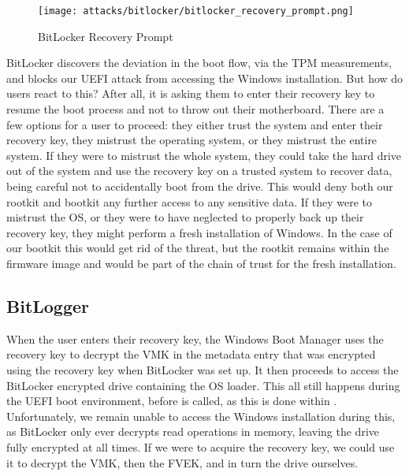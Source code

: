 \begin{figure}[htb]
    \centering
    \texttt{[image: attacks/bitlocker/bitlocker\_recovery\_prompt.png]}
    \caption{BitLocker Recovery Prompt}
    \label{fig:bitlocker-recovery-prompt}
\end{figure}

BitLocker discovers the deviation in the boot flow, via the \ac{TPM} measurements, and blocks our \ac{UEFI} attack from accessing the Windows installation.
But how do users react to this?
After all, it is asking them to enter their recovery key to resume the boot process and not to throw out their motherboard.
There are a few options for a user to proceed: they either trust the system and enter their recovery key, they mistrust the operating system, or they mistrust the entire system.
If they were to mistrust the whole system, they could take the hard drive out of the system and use the recovery key on a trusted system to recover data, being careful not to accidentally boot from the drive.
This would deny both our rootkit and bootkit any further access to any sensitive data.
If they were to mistrust the \ac{OS}, or they were to have neglected to properly back up their recovery key, they might perform a fresh installation of Windows.
In the case of our bootkit this would get rid of the threat, but the rootkit remains within the firmware image and would be part of the chain of trust for the fresh installation.

\subsection{BitLogger}

When the user enters their recovery key, the Windows Boot Manager uses the recovery key to decrypt the \ac{VMK} in the metadata entry that was encrypted using the recovery key when BitLocker was set up.
It then proceeds to access the BitLocker encrypted drive containing the  \ac{OS} loader.
This all still happens during the \ac{UEFI} boot environment, before  is called, as this is done within .
Unfortunately, we remain unable to access the Windows installation during this, as BitLocker only ever decrypts read operations in memory, leaving the drive fully encrypted at all times.
If we were to acquire the recovery key, we could use it to decrypt the \ac{VMK}, then the \ac{FVEK}, and in turn the drive ourselves.

